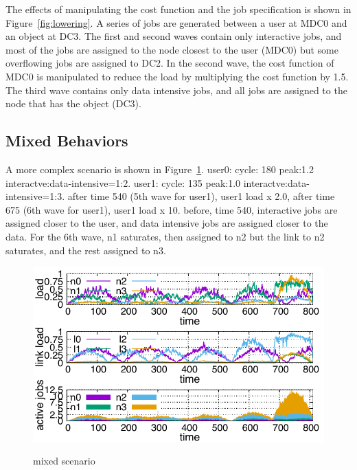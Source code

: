 The effects of manipulating the cost function and the job
specification is shown in Figure~\ref{fig:lowering}.
A series of jobs are generated between a user at MDC0 and an object at DC3.
The first and second waves contain only interactive jobs, and most of
the jobs are assigned to the node closest to the user (MDC0) but some
overflowing jobs are assigned to DC2.
In the second wave, the cost function of MDC0 is manipulated to reduce
the load by multiplying the cost function by 1.5.
The third wave contains only data intensive jobs, and all jobs are
assigned to the node that has the object (DC3).

\subsection{Mixed Behaviors}

A more complex scenario is shown in Figure~\ref{fig:mixed}.
user0: cycle: 180  peak:1.2 interactve:data-intensive=1:2.
user1: cycle: 135  peak:1.0  interactve:data-intensive=1:3.
after time 540 (5th wave for user1), user1 load x 2.0, 
after time 675 (6th wave for user1), user1 load x 10.
before, time 540, interactive jobs are assigned closer to the user,
and data intensive jobs are assigned closer to the data.
For the 6th wave, n1 saturates, then assigned to n2 but the link to n2
saturates, and the rest assigned to n3.

\begin{figure}[tb]
  \begin{center}
    \includegraphics[width=1.0\columnwidth]{simu2.pdf}
    \vspace{-2.0ex}
    \caption{mixed scenario}
    \label{fig:mixed}
  \end{center}
\end{figure}
